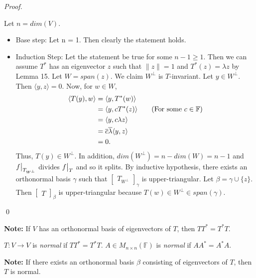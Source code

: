\documentclass[12pt]{article}
\newenvironment{definition}[2][Definition]{\begin{trivlist}
\item[\hskip \labelsep {\bfseries #1}\hskip \labelsep {\bfseries #2}]}{\end{trivlist}}
\newenvironment{sol}
    {\emph{Proof.}
    }
    {
    \qed
    }
\newcommand\restr[2]{{%
  \left.\kern-\nulldelimiterspace %
  #1 %
  \vphantom{\big|} %
  \right|_{#2} %
  }}
\begin{document}
\begin{sol}
Let $n = dim(V)$.
\begin{itemize}
    \item Base step: Let n = 1. Then clearly the statement holds.
    \item Induction Step: Let the statement be true for some $n - 1 \geq 1$. Then we can assume $T^*$ has an eigenvector $z$ such that $\lVert z \rVert = 1$ and $T^*(z) = \lambda z$ by Lemma 15. Let $W = span(z)$. We claim $W^\perp$ is $T$-invariant. Let $y \in W^\perp$. Then $\langle y, z \rangle = 0$. Now, for $w \in W$, \begin{align*}
        \langle T(y), w \rangle &= \langle y, T^*(w) \rangle \\
        &= \langle y, cT^*(z) \rangle \tag{For some $c \in \mathbb{F}$} \\
        &= \langle y, c \lambda z \rangle \\
        &= \overline{c} \overline{\lambda} \langle y, z \rangle \\
        &= 0.
    \end{align*} Thus, $T(y) \in W^\perp$. In addition, $dim(W^\perp) = n - dim(W) = n - 1$ and $\restr{f}{T_{W^\perp}}$ divides $\restr{f}{T}$ and so it splits. By inductive hypothesis, there exists an orthonormal basis $\gamma$ such that $\begin{bmatrix}
    T_{W^\perp}
    \end{bmatrix}_\gamma$ is upper-triangular. Let $\beta = \gamma \cup \{z\}$. Then $\begin{bmatrix}
    T
    \end{bmatrix}_\beta$ is upper-triangular because $T(w) \in W^\perp \in span(\gamma)$.
\end{itemize}
\end{sol}

\noindent\textbf{Note:} If $V$ has an orthonormal basis of eigenvectors of $T$, then $TT^* = T^*T$.

\begin{definition}{7}
$T : V \to V$ is \textit{normal} if $TT^* = T^*T$. $A \in M_{n \times n}(\mathbb{F})$ is \textit{normal} if $AA^* = A^*A$.
\end{definition}

\noindent\textbf{Note:} If there exists an orthonormal basis $\beta$ consisting of eigenvectors of $T$, then $T$ is normal.
\end{document}
